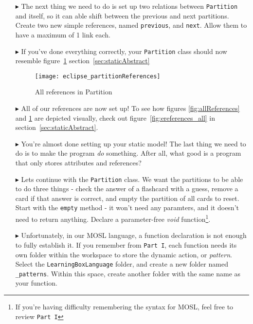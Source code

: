 \begin{itemize}
\item[$\blacktriangleright$] The next thing we need to do is set up two relations between \texttt{Partition} and itself, so it can able shift between the previous and next partitions. Create two new simple references, named \texttt{previous}, and \texttt{next}. Allow them to have a maximum of 1 link each.

\item[$\blacktriangleright$] If you've done everything correctly, your \texttt{Partition} class should now resemble figure~\ref{fig:partitionReferences}
section~\ref{sec:staticAbstract}

\begin{figure}[htbp]
	\centering
  \texttt{[image: eclipse\_partitionReferences]}
	\caption{All references in Partition}
	\label{fig:partitionReferences}
\end{figure} 

\item[$\blacktriangleright$] All of our references are now set up! To see how figures \ref{fig:allReferences} and \ref{fig:partitionReferences} are depicted visually, check out figure~\ref{fig:ereferences_all} in section~\ref{sec:staticAbstract}.

\item[$\blacktriangleright$] You're almost done setting up your static model! The last thing we need to do is to make the program \emph{do} something. After all, what good is a program that only stores attributes and references?

\item[$\blacktriangleright$] Lets continue with the \texttt{Partition} class. We want the partitions to be able to do three things - check the answer of a flashcard with a guess, remove a card if that answer is correct, and empty the partition of all cards to reset. Start with the \texttt{empty} method - it won't need any paramters, and it doesn't need to return anything. Declare a parameter-free \emph{void} function\footnote{If you're having difficulty remembering the syntax for MOSL, feel free to review \mbox{\texttt{Part I}}}.

\item[$\blacktriangleright$] Unfortunately, in our MOSL language, a function declaration is not enough to fully establish it. If you remember from \texttt{Part I}, each function needs its own folder within the workspace to store the dynamic action, or \emph{pattern}. Select the \texttt{LearningBoxLanguage} folder, and create a new folder named \texttt{\_patterns}. Within this space, create another folder with the same name as your function.


\end{itemize}
